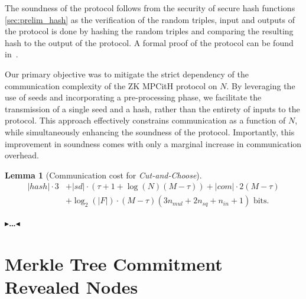 \documentclass[11pt]{report}
\theoremstyle{definition}
\theoremstyle{plain}
\newtheorem{lemma}{Lemma}[section]
\newcommand{\todo}[1]{{\color[rgb]{.5,0,0}\textbf{$\blacktriangleright$#1$\blacktriangleleft$}}}
\begin{document}
The soundness of the protocol follows from the security of secure hash functions \autoref{sec:prelim_hash} as the verification of the random triples, input and outputs of the protocol is done by hashing the random triples and comparing the resulting hash to the output of the protocol. A formal proof of the protocol can be found in~\cite[p9]{baum2020concretely}.

Our primary objective was to mitigate the strict dependency of the communication complexity of the ZK MPCitH protocol on $N$. By leveraging the use of seeds and incorporating a pre-processing phase, we facilitate the transmission of a single seed and a hash, rather than the entirety of inputs to the protocol. This approach effectively constrains communication as a function of $N$, while simultaneously enhancing the soundness of the protocol. Importantly, this improvement in soundness comes with only a marginal increase in communication overhead.

\begin{lemma}[Communication cost for \textit{Cut-and-Choose}]
  \begin{align*}
    |hash| \cdot 3 & + |sd| \cdot (\tau + 1 + \log(N) (M - \tau )) + |com| \cdot 2(M - \tau )      \\
                   & + \log_2(|F|) \cdot (M - \tau )(3n_{mul} + 2n_{sq} + n_{in} + 1)\text{ bits.}
  \end{align*}
\end{lemma}

\todo{\dots}

\section{Merkle Tree Commitment Revealed Nodes}\label{sub:merkle_tree_revealed_nodes}
\end{document}
